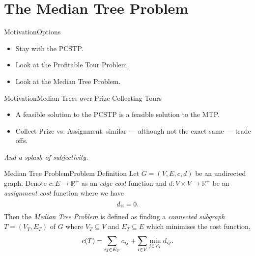 \documentclass[rgb,dvipsnames]{beamer}
\newcommand{\RR}{\mathbb{R}}      %
\begin{document}
\section{The Median Tree Problem}
\begin{frame}{Motivation}{Options}
  \begin{itemize}
  \item Stay with the PCSTP.
  \item Look at the Profitable Tour Problem.
  \item Look at the Median Tree Problem.
  \end{itemize}
\end{frame}
\begin{frame}{Motivation}{Median Trees over Prize-Collecting Tours}
  \begin{itemize}
  \item A feasible solution to the PCSTP is a feasible solution to the MTP.
  \item Collect Prize vs. Assignment: similar --- although not the exact same --- trade offs.
  \end{itemize}
  \pause
 \textit{And a splash of subjectivity.}
\end{frame}
\begin{frame}{Median Tree Problem}{Problem Definition}
  Let $G = (V, E, c, d)$ be an undirected graph. Denote $c : E \to \RR^+$ as an \textit{edge cost} function
and $d : V \times V  \to \RR^+$ be an \textit{assignment cost} function where we have
\[d_{ii} = 0 \mathnormal{.}\]
Then the \textit{Median Tree Problem}
is defined as finding a \textit{connected subgraph} $T = (V_T, E_T)$ of $G$
where $V_T \subseteq V$ and
$E_T \subseteq E$ which minimises the cost function,
\[c(T) = \sum_{ij \in E_T} c_{ij} + \sum_{i \in V} \min_{j \in V_T} d_{ij}\mathnormal{.}\]
\end{frame}
\end{document}
